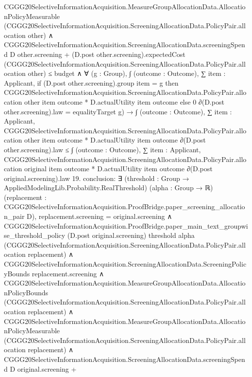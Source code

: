 \documentclass[10pt]{article}
\begin{document}
\begin{ReviewVerbatim}
          CGGG20SelectiveInformationAcquisition.MeasureGroupAllocationData.AllocationPolicyMeasurable
              (CGGG20SelectiveInformationAcquisition.ScreeningAllocationData.PolicyPair.allocation other) ∧
            CGGG20SelectiveInformationAcquisition.ScreeningAllocationData.screeningSpend D other.screening +
                  (D.post other.screening).expectedCost
                    (CGGG20SelectiveInformationAcquisition.ScreeningAllocationData.PolicyPair.allocation other) ≤
                budget ∧
              ∀ (g : Group),
                ∫ (outcome : Outcome),
                    ∑ item : Applicant,
                      if (D.post other.screening).group item = g then
                        CGGG20SelectiveInformationAcquisition.ScreeningAllocationData.PolicyPair.allocation other item
                            outcome *
                          D.actualUtility item outcome
                      else 0 ∂(D.post other.screening).law =
                  equalityTarget g) →
      ∫ (outcome : Outcome),
          ∑ item : Applicant,
            CGGG20SelectiveInformationAcquisition.ScreeningAllocationData.PolicyPair.allocation other item outcome *
              D.actualUtility item outcome ∂(D.post other.screening).law ≤
        ∫ (outcome : Outcome),
          ∑ item : Applicant,
            CGGG20SelectiveInformationAcquisition.ScreeningAllocationData.PolicyPair.allocation original item outcome *
              D.actualUtility item outcome ∂(D.post original.screening).law
19. conclusion: ∃ (threshold : Group → AppliedModelingLib.Probability.RealThreshold) (alpha : Group → ℝ) (replacement :
  CGGG20SelectiveInformationAcquisition.ProofBridge.paper_screening_allocation_pair D),
  replacement.screening = original.screening ∧
    CGGG20SelectiveInformationAcquisition.ProofBridge.paper_main_text_groupwise_threshold_policy
        (D.post original.screening) threshold alpha
        (CGGG20SelectiveInformationAcquisition.ScreeningAllocationData.PolicyPair.allocation replacement) ∧
      CGGG20SelectiveInformationAcquisition.ScreeningAllocationData.ScreeningPolicyBounds replacement.screening ∧
        CGGG20SelectiveInformationAcquisition.MeasureGroupAllocationData.AllocationPolicyBounds
            (CGGG20SelectiveInformationAcquisition.ScreeningAllocationData.PolicyPair.allocation replacement) ∧
          CGGG20SelectiveInformationAcquisition.MeasureGroupAllocationData.AllocationPolicyMeasurable
              (CGGG20SelectiveInformationAcquisition.ScreeningAllocationData.PolicyPair.allocation replacement) ∧
            CGGG20SelectiveInformationAcquisition.ScreeningAllocationData.screeningSpend D original.screening +

\end{ReviewVerbatim}
\end{document}
